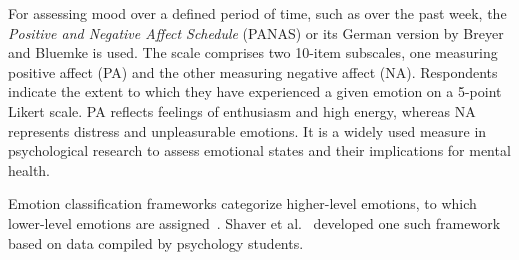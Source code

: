 For assessing mood over a defined period of time, such as over the past week, the \textit{Positive and Negative Affect Schedule} (PANAS) \cite{watson1988development} or its German version by Breyer and Bluemke \cite{breyer2016panas-de} is used. The scale comprises two 10-item subscales, one measuring positive affect (PA) and the other measuring negative affect (NA). Respondents indicate the extent to which they have experienced a given emotion on a 5-point Likert scale. PA reflects feelings of enthusiasm and high energy, whereas NA represents distress and unpleasurable emotions. It is a widely used measure in psychological research to assess emotional states and their implications for mental health.

Emotion classification frameworks categorize higher-level emotions, to which lower-level emotions are assigned~\cite{shaver1987emotion}. Shaver et al.~\cite{shaver1987emotion} developed one such framework based on data compiled by psychology students.